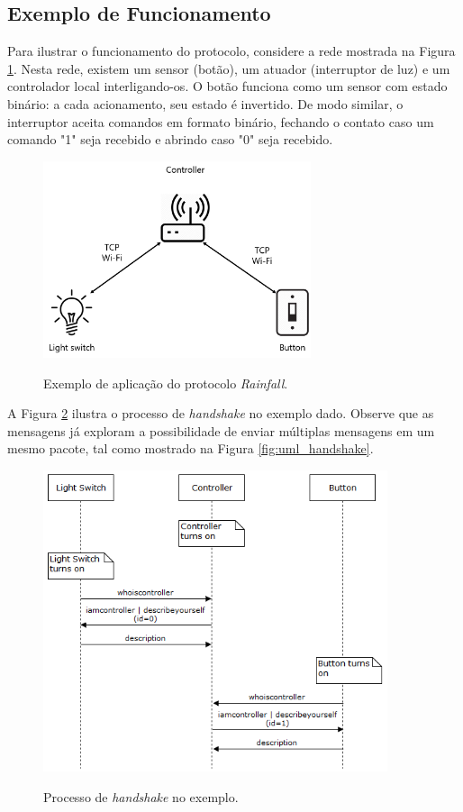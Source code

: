 \subsection{Exemplo de Funcionamento}
Para ilustrar o funcionamento do protocolo, considere a rede mostrada na Figura \ref{fig:exemplo_rede}. Nesta rede, existem um sensor (botão), um atuador (interruptor de luz) e um controlador local interligando-os. O botão funciona como um sensor com estado binário: a cada acionamento, seu estado é invertido. De modo similar, o interruptor aceita comandos em formato binário, fechando o contato caso um comando "1" seja recebido e abrindo caso "0" seja recebido.

\begin{figure}[h]
	\centering
	\caption{Exemplo de aplicação do protocolo \textit{Rainfall}.}
	\includegraphics[width=0.7\textwidth]{imagens/exemplo_rede.png}
 	\label{fig:exemplo_rede}
\end{figure}

A Figura \ref{fig:exemplo_handshake} ilustra o processo de \textit{handshake} no exemplo dado. Observe que as mensagens já exploram a possibilidade de enviar múltiplas mensagens em um mesmo pacote, tal como mostrado na Figura \ref{fig:uml_handshake}.

\begin{figure}[hp]
	\centering
	\caption{Processo de \textit{handshake} no exemplo.}
	\includegraphics[width=0.9\textwidth]{imagens/exemplo_handshake.png}
 	\label{fig:exemplo_handshake}
\end{figure}

